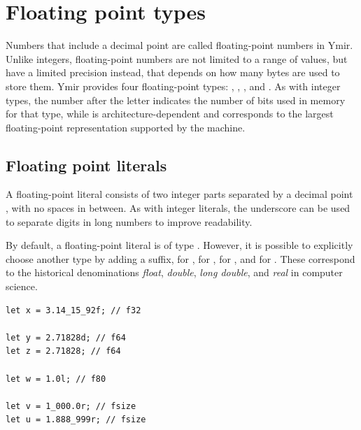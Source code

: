 \vfill%
\pagebreak
\section{Floating point types}

Numbers that include a decimal point are called floating-point numbers in Ymir.
Unlike integers, floating-point numbers are not limited to a range of values,
but have a limited precision instead, that depends on how many bytes are used to
store them. Ymir provides four floating-point types: , ,
, and . As with integer types, the number after the
letter  indicates the number of bits used in memory for that type,
while  is architecture-dependent and corresponds to the largest
floating-point representation supported by the machine.

\subsection{Floating point literals}

A floating-point literal consists of two integer parts separated by a decimal
point , with no spaces in between. As with integer literals, the
underscore \token{\_} can be used to separate digits in long numbers to improve
readability.

By default, a floating-point literal is of type . However, it is
possible to explicitly choose another type by adding a suffix, 
for ,  for ,  for ,
and  for . These correspond to the historical
denominations \textit{float}, \textit{double}, \textit{long double},
and \textit{real} in computer science.

\begin{lstlisting}[style=coloredverbatim, label=lst:(chap2):float_literal, caption=Example of floating point literals]
let x = 3.14_15_92f; // f32

let y = 2.71828d; // f64
let z = 2.71828; // f64

let w = 1.0l; // f80

let v = 1_000.0r; // fsize
let u = 1.888_999r; // fsize
\end{lstlisting}


